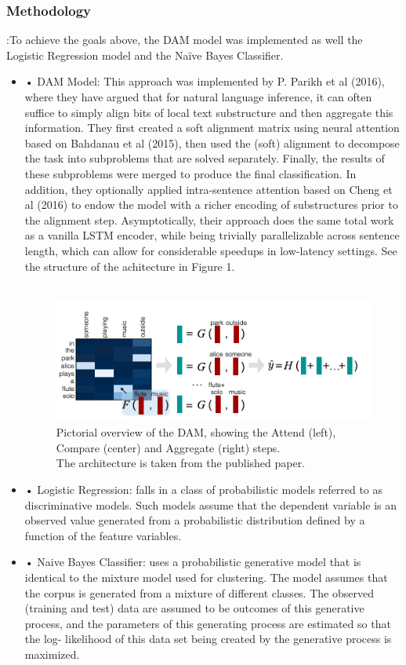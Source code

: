 \documentclass[runningheads]{llncs}
\begin{document}
\subsubsection{Methodology} {:}To achieve the goals above, the DAM model was implemented as well the Logistic Regression model and the Naïve Bayes Classifier.
	\begin{itemize}
		\item•	DAM Model: This approach was implemented by P. Parikh et al (2016), where they have argued that for natural language inference, it can often suffice to simply align bits of local text substructure and then aggregate this information. They first created a soft alignment matrix using neural attention based on Bahdanau et al (2015), then used the (soft) alignment to decompose the task into subproblems that are solved separately. Finally, the results of these subproblems were merged to produce the final classification. In addition, they optionally applied intra-sentence attention based on Cheng et al (2016) to endow the model with a richer encoding of substructures prior to the alignment step. Asymptotically, their approach does the same total work as a vanilla LSTM encoder, while being trivially parallelizable across sentence length, which can allow for considerable speedups in low-latency settings.  See the structure of the achitecture in Figure 1.
\\
		\\
		\begin{figure}
			\includegraphics[scale=0.8]{model achitect}
			\centering
			\caption{Pictorial overview of the DAM, showing the Attend (left), Compare (center) and Aggregate (right) steps.\\
			The architecture is taken from the published paper.}
			\label{fig:dataset}
		\end{figure}
			\item •	Logistic Regression: falls in a class of probabilistic models referred to as discriminative models. Such models assume that the dependent variable is an observed value generated from a probabilistic distribution defined by a function of the feature variables. \\
			\item •	Naive Bayes Classifier: uses a probabilistic generative model that is identical to the mixture model used for clustering. The model assumes that the corpus is generated from a mixture of different classes. The observed (training and test) data are assumed to be outcomes of this generative process, and the parameters of this generating process are estimated so that the log- likelihood of this data set being created by the generative process is maximized. 
		\end{itemize}
\end{document}

